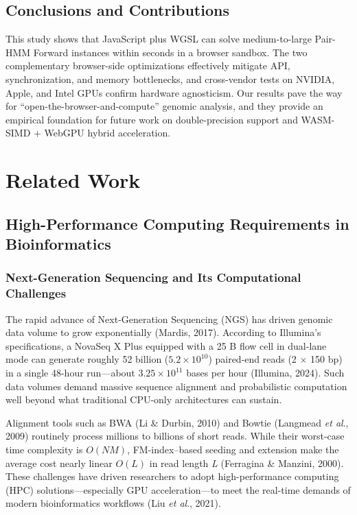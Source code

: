 \documentclass[PhD]{PHlab-thesis}
\begin{document}
\section{Conclusions and Contributions}
This study shows that JavaScript plus WGSL can solve medium-to-large Pair-HMM Forward instances within seconds in a browser sandbox. The two complementary browser-side optimizations effectively mitigate API, synchronization, and memory bottlenecks, and cross-vendor tests on NVIDIA, Apple, and Intel GPUs confirm hardware agnosticism. Our results pave the way for “open-the-browser-and-compute” genomic analysis, and they provide an empirical foundation for future work on double-precision support and WASM-SIMD + WebGPU hybrid acceleration.


\chapter{Related Work}

\section{High-Performance Computing Requirements in Bioinformatics}

\subsection{Next-Generation Sequencing and Its Computational Challenges}
The rapid advance of Next-Generation Sequencing (NGS) has driven genomic data volume to grow exponentially (Mardis, 2017). According to Illumina's specifications, a NovaSeq X Plus equipped with a 25 B flow cell in dual-lane mode can generate roughly 52 billion ($5.2 \times 10^{10}$) paired-end reads (2 $\times$ 150 bp) in a single 48-hour run—about $3.25 \times 10^{11}$ bases per hour (Illumina, 2024). Such data volumes demand massive sequence alignment and probabilistic computation well beyond what traditional CPU-only architectures can sustain.

Alignment tools such as BWA (Li \& Durbin, 2010) and Bowtie (Langmead \emph{et al}., 2009) routinely process millions to billions of short reads. While their worst-case time complexity is $O(NM)$, FM-index–based seeding and extension make the average cost nearly linear $O(L)$ in read length \emph{L} (Ferragina \& Manzini, 2000). These challenges have driven researchers to adopt high-performance computing (HPC) solutions—especially GPU acceleration—to meet the real-time demands of modern bioinformatics workflows (Liu \emph{et al}., 2021).
\end{document}
